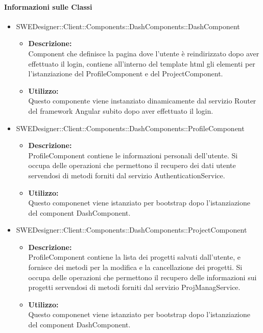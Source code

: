 		\paragraph{Informazioni sulle Classi}
		\begin{itemize}
			\item SWEDesigner::Client::Components::DashComponents::DashComponent
			\begin{itemize}
				\item \textbf{Descrizione: }\\
				Component che definisce la pagina dove l'utente è reindirizzato dopo aver
				effettuato il login, contiene all'interno del template html gli elementi
				per l'istanziazione del ProfileComponent e del ProjectComponent.
				\item \textbf{Utilizzo: }\\
				Questo componente viene instanziato dinamicamente dal servizio Router del
				framework Angular subito dopo aver effettuato il login.
			\end{itemize}
			\item SWEDesigner::Client::Components::DashComponents::ProfileComponent
			\begin{itemize}
				\item \textbf{Descrizione: }\\
				ProfileComponent contiene le informazioni personali dell'utente. Si occupa
				delle operazioni che permettono il recupero dei dati utente servendosi di
				metodi forniti dal servizio AuthenticationService.
				\item \textbf{Utilizzo: }\\
				Questo componenet viene istanziato per bootstrap dopo l'istanziazione
				del component DashComponent.
			\end{itemize}
			\item SWEDesigner::Client::Components::DashComponents::ProjectComponent
			\begin{itemize}
				\item \textbf{Descrizione: }\\
				ProfileComponent contiene la lista dei progetti salvati dall'utente, e
				fornisce dei metodi per la modifica e la cancellazione dei progetti. Si
				occupa delle operazioni che permettono il recupero delle informazioni sui
				progetti servendosi di metodi forniti dal servizio ProjManagService.
				\item \textbf{Utilizzo: }\\
				Questo componenet viene istanziato per bootstrap dopo l'istanziazione
				del component DashComponent.
			\end{itemize}
		\end{itemize}

